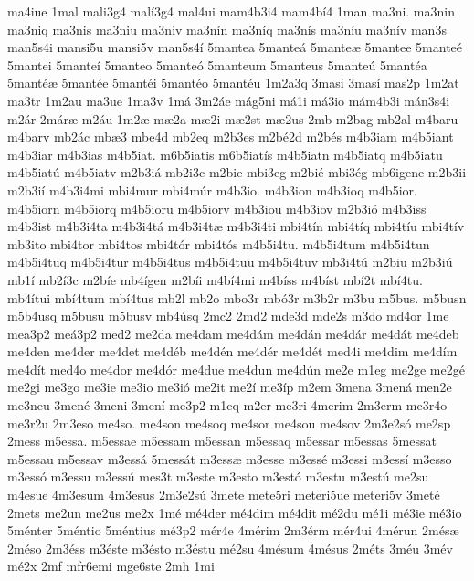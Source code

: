 {ma4iue
1mal
mali3g4
mal^^ed3g4
mal4ui
mam4b3i4
mam4b^^ed4
1man
ma3ni.
ma3nin
ma3niq
ma3nis
ma3niu
ma3niv
ma3n^^edn
ma3n^^edq
ma3n^^eds
ma3n^^edu
ma3n^^edv
man3s
man5s4i
mansi5u
mansi5v
man5s4^^ed
5mantea
5mante^^e1
5mante^^e6
5mantee
5mante^^e9
5mantei
5mante^^ed
5manteo
5mante^^f3
5manteum
5manteus
5mante^^fa
5mant^^e9a
5mant^^e9^^e6
5mant^^e9e
5mant^^e9i
5mant^^e9o
5mant^^e9u
1m2a3q
3masi
3mas^^ed
mas2p
1m2at
ma3tr
1m2au
ma3ue
1ma3v
1m^^e1
3m2^^e1e
m^^e1g5ni
m^^e11i
m^^e13io
m^^e1m4b3i
m^^e1n3s4i
m2^^e1r
2m^^e1r^^e6
m2^^e1u
1m2^^e6
m^^e62a
m^^e62i
m^^e62st
m^^e62us
2mb
m2bag
mb2al
m4baru
m4barv
mb2^^e1c
mb^^e63
mbe4d
mb2eq
m2b3es
m2b^^e92d
m2b^^e9s
m4b3iam
m4b5iant
m4b3iar
m4b3ias
m4b5iat.
m6b5iatis
m6b5iat^^eds
m4b5iatn
m4b5iatq
m4b5iatu
m4b5iat^^fa
m4b5iatv
m2b3i^^e1
mb2i3c
m2bie
mbi3eg
m2bi^^e9
mbi3^^e9g
mb6igene
m2b3ii
m2b3i^^ed
m4b3i4mi
mbi4mur
mbi4m^^far
m4b3io.
m4b3ion
m4b3ioq
m4b5ior.
m4b5iorn
m4b5iorq
m4b5ioru
m4b5iorv
m4b3iou
m4b3iov
m2b3i^^f3
m4b3iss
m4b3ist
m4b3i4ta
m4b3i4t^^e1
m4b3i4t^^e6
m4b3i4ti
mbi4t^^edn
mbi4t^^edq
mbi4t^^edu
mbi4t^^edv
mb3ito
mbi4tor
mbi4tos
mbi4t^^f3r
mbi4t^^f3s
m4b5i4tu.
m4b5i4tum
m4b5i4tun
m4b5i4tuq
m4b5i4tur
m4b5i4tus
m4b5i4tuu
m4b5i4tuv
mb3i4t^^fa
m2biu
m2b3i^^fa
mb1^^ed
mb2^^ed3c
m2b^^ede
mb4^^edgen
m2b^^edi
m4b^^ed4mi
m4b^^edss
m4b^^edst
mb^^ed2t
mb^^ed4tu.
mb4^^edtui
mb^^ed4tum
mb^^ed4tus
mb2l
mb2o
mbo3r
mb^^f33r
m3b2r
m3bu
m5bus.
m5busn
m5b4usq
m5busu
m5busv
mb4^^fasq
2mc2
2md2
mde3d
mde2s
m3do
md4or
1me
mea3p2
me^^e13p2
med2
me2da
me4dam
me4d^^e1m
me4d^^e1n
me4d^^e1r
me4d^^e1t
me4deb
me4den
me4der
me4det
me4d^^e9b
me4d^^e9n
me4d^^e9r
me4d^^e9t
med4i
me4dim
me4d^^edm
me4d^^edt
med4o
me4dor
me4d^^f3r
me4due
me4dun
me4d^^fan
me2e
m1eg
me2ge
me2g^^e9
me2gi
me3go
me3ie
me3io
me3i^^f3
me2it
me2^^ed
me3^^edp
m2em
3mena
3men^^e1
men2e
me3neu
3men^^e9
3meni
3men^^ed
me3p2
m1eq
m2er
me3ri
4merim
2m3erm
me3r4o
me3r2u
2m3eso
me4so.
me4son
me4soq
me4sor
me4sou
me4sov
2m3e2s^^f3
me2sp
2mess
m5essa.
m5essae
m5essam
m5essan
m5essaq
m5essar
m5essas
5messat
m5essau
m5essav
m3ess^^e1
5mess^^e1t
m3ess^^e6
m3esse
m3ess^^e9
m3essi
m3ess^^ed
m3esso
m3ess^^f3
m3essu
m3ess^^fa
mes3t
m3este
m3esto
m3est^^f3
m3estu
m3est^^fa
me2su
m4esue
4m3esum
4m3esus
2m3e2s^^fa
3mete
mete5ri
meteri5ue
meteri5v
3met^^e9
2mets
me2un
me2us
me2x
1m^^e9
m^^e94der
m^^e94dim
m^^e94dit
m^^e92du
m^^e91i
m^^e93ie
m^^e93io
5m^^e9nter
5m^^e9ntio
5m^^e9ntius
m^^e93p2
m^^e9r4e
4m^^e9rim
2m3^^e9rm
m^^e9r4ui
4m^^e9run
2m^^e9s^^e6
2m^^e9so
2m3^^e9ss
m3^^e9ste
m3^^e9sto
m3^^e9stu
m^^e92su
4m^^e9sum
4m^^e9sus
2m^^e9ts
3m^^e9u
3m^^e9v
m^^e92x
2mf
mfr6emi
mge6ste
2mh
1mi
}
